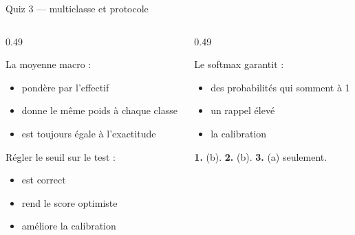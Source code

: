 \begin{frame}{Quiz 3 --- multiclasse et protocole}
\begin{columns}[t]
\begin{column}{0.49\textwidth}
\begin{qbox}[Question 1]
La moyenne macro :
\begin{itemize}
  \item[(a)] pondère par l'effectif
  \item[(b)] donne le même poids à chaque classe
  \item[(c)] est toujours égale à l'exactitude
\end{itemize}
\end{qbox}
\begin{qbox}[Question 2]
Régler le seuil sur le test :
\begin{itemize}
  \item[(a)] est correct
  \item[(b)] rend le score optimiste
  \item[(c)] améliore la calibration
\end{itemize}
\end{qbox}
\end{column}
\begin{column}{0.49\textwidth}
\begin{qbox}[Question 3]
Le softmax garantit :
\begin{itemize}
  \item[(a)] des probabilités qui somment à 1
  \item[(b)] un rappel élevé
  \item[(c)] la calibration
\end{itemize}
\end{qbox}
\begin{solbox}[Réponses]
\textbf{1.} (b). \quad \textbf{2.} (b). \quad \textbf{3.} (a) seulement.
\end{solbox}
\end{column}
\end{columns}
\end{frame}

